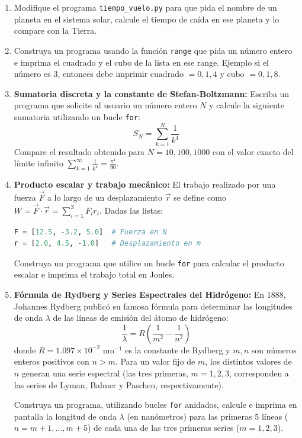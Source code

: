 \documentclass[12pt]{article}
\begin{document}
\begin{problemas}[]
\begin{enumerate}[leftmargin=*]

\item Modifique el programa \lstinline|tiempo_vuelo.py| para que pida el nombre de un planeta
en el sistema solar, calcule el tiempo de caída en ese planeta y lo compare con la Tierra.

\item Construya un programa usando la función \lstinline|range| que pida un número entero 
e imprima el cuadrado y el cubo de la lista en ese range. Ejemplo si el número es 3, entonces
debe imprimir cuadrado $= 0, 1, 4$ y cubo $= 0, 1, 8$.

\item \textbf{Sumatoria discreta y la constante de Stefan-Boltzmann:} Escriba un programa que solicite al usuario un número entero $N$ y calcule la siguiente sumatoria utilizando un bucle \lstinline|for|:
    \[
    S_N = \sum_{k=1}^{N} \frac{1}{k^4}
    \]
    Compare el resultado obtenido para $N = 10, 100, 1000$ con el valor exacto del límite infinito $\sum_{k=1}^{\infty} \frac{1}{k^4} = \frac{\pi^4}{90}$.

    \item \textbf{Producto escalar y trabajo mecánico:} El trabajo realizado por una fuerza $\vec{F}$ a lo largo de un desplazamiento $\vec{r}$ se define como $W = \vec{F} \cdot \vec{r} = \sum_{i=1}^{3} F_i r_i$. Dadas las listas:
\begin{lstlisting}[language=Python]
F = [12.5, -3.2, 5.0]  # Fuerza en N
r = [2.0, 4.5, -1.0]   # Desplazamiento en m
\end{lstlisting}
Construya un programa que utilice un bucle \lstinline|for| para calcular el producto escalar e imprima el trabajo total en Joules.

\item \textbf{Fórmula de Rydberg y Series Espectrales del Hidrógeno:} En 1888, Johannes Rydberg publicó su famosa fórmula para determinar las longitudes de onda $\lambda$ de las líneas de emisión del átomo de hidrógeno:
\[
\frac{1}{\lambda} = R \left( \frac{1}{m^2} - \frac{1}{n^2} \right)
\]
donde $R = 1.097 \times 10^{-2}\text{ nm}^{-1}$ es la constante de Rydberg y $m, n$ son números enteros positivos con $n > m$. Para un valor fijo de $m$, los distintos valores de $n$ generan una serie espectral (las tres primeras, $m=1, 2, 3$, corresponden a las series de Lyman, Balmer y Paschen, respectivamente).

Construya un programa, utilizando bucles \lstinline|for| anidados, calcule e 
imprima en pantalla la longitud de onda $\lambda$ (en nanómetros) 
para las primeras 5 líneas ($n = m+1, \dots, m+5$) 
de cada una de las tres primeras series ($m = 1, 2, 3$).
\end{enumerate}

\end{problemas}
\end{document}
